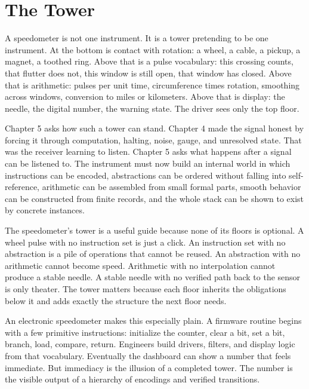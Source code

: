 \chapter{The Tower}
\label{chap:the-tower}


A speedometer is not one instrument. It is a tower pretending to be one
instrument. At the bottom is contact with rotation: a wheel, a cable, a pickup,
a magnet, a toothed ring. Above that is a pulse vocabulary: this crossing
counts, that flutter does not, this window is still open, that window has
closed. Above that is arithmetic: pulses per unit time, circumference times
rotation, smoothing across windows, conversion to miles or kilometers. Above
that is display: the needle, the digital number, the warning state. The driver
sees only the top floor.

Chapter 5 asks how such a tower can stand. Chapter 4 made the signal honest by
forcing it through computation, halting, noise, gauge, and unresolved state.
That was the receiver learning to listen. Chapter 5 asks what happens after a
signal can be listened to. The instrument must now build an internal world in
which instructions can be encoded, abstractions can be ordered without falling
into self-reference, arithmetic can be assembled from small formal parts,
smooth behavior can be constructed from finite records, and the whole stack can
be shown to exist by concrete instances.

The speedometer's tower is a useful guide because none of its floors is
optional. A wheel pulse with no instruction set is just a click. An instruction
set with no abstraction is a pile of operations that cannot be reused. An
abstraction with no arithmetic cannot become speed. Arithmetic with no
interpolation cannot produce a stable needle. A stable needle with no verified
path back to the sensor is only theater. The tower matters because each floor
inherits the obligations below it and adds exactly the structure the next floor
needs.

An electronic speedometer makes this especially plain. A firmware routine
begins with a few primitive instructions: initialize the counter, clear a bit,
set a bit, branch, load, compare, return. Engineers build drivers, filters, and
display logic from that vocabulary. Eventually the dashboard can show a number
that feels immediate. But immediacy is the illusion of a completed tower. The
number is the visible output of a hierarchy of encodings and verified
transitions.

